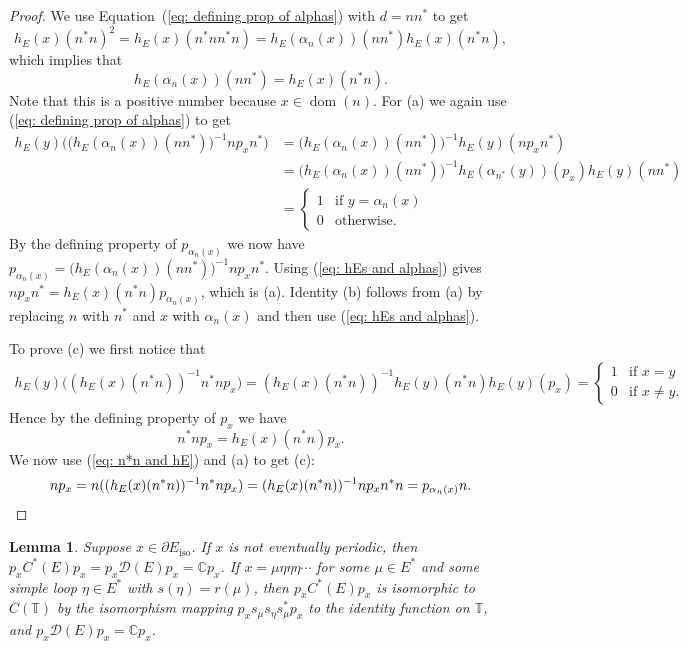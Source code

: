 \documentclass[12pt, a4paper]{amsart}
\numberwithin{equation}{section}
\newtheorem{lemma}[thm]{Lemma}
\theoremstyle{definition}
\theoremstyle{remark}
\begin{document}
\begin{proof}
We use Equation~(\ref{eq: defining prop of alphas}) with 
$d=nn^*$ 
to get
\[
h_E(x)(n^*n)^2=h_E(x)(n^*nn^*n)=h_E(\alpha_n(x))(nn^*)h_E(x)(n^*n),
\]
which implies that 
\begin{equation}\label{eq: hEs and alphas}
h_E(\alpha_n(x))(nn^*)=h_E(x)(n^*n). 
\end{equation}
Note that this is a 
positive number because $x\in{{\operatorname{dom}}}(n)$. For (a) we again use 
(\ref{eq: defining prop of alphas}) to get
\begin{align*}
h_E(y)\big(\bigl(h_E(\alpha_n(x))(nn^*)\bigr)^{-1}np_xn^*\big) &= 
\bigl(h_E(\alpha_n(x))(nn^*)\bigr)^{-1}h_E(y)(np_xn^*)\\
&= \bigl(h_E(\alpha_n(x))(nn^*)\bigr)^{-1}h_E(\alpha_{n^*}(y))(p_x)h_E(y)(nn^*)\\
&= 
\begin{cases}
1 & \text{if $y=\alpha_n(x)$}\\
0 & \text{otherwise}.
\end{cases}
\end{align*}
By the defining property of $p_{\alpha_n(x)}$ we now have 
$p_{\alpha_n(x)}=\bigl(h_E(\alpha_n(x))(nn^*)\bigr)^{-1}np_xn^*$. Using (\ref{eq: hEs and 
alphas}) gives $np_xn^*=h_E(x)(n^*n)p_{\alpha_n(x)}$, which is (a). 
Identity (b) follows from (a) by replacing $n$ with $n^*$ and $x$ with 
$\alpha_n(x)$ and then use (\ref{eq: hEs and 
alphas}).

To prove (c) we first notice that
\begin{align*}
h_E(y)\big((h_E(x)(n^*n))^{-1}n^*np_x\big)=(h_E(x)(n^*n))^{-1}h_E(y)(n^*n)h_E(y)(p_x)=
\begin{cases}
1 & \text{if $x=y$}\\
0 & \text{if $x\not=y$.}
\end{cases}
\end{align*} 
Hence by the defining property of $p_x$ we have
\begin{equation}\label{eq: n*n and hE}
n^*np_x=h_E(x)(n^*n)p_x.
\end{equation} 
We now use (\ref{eq: n*n and hE}) and (a) to get (c): 
\[
np_x = n((h_E(x)(n^*n))^{-1}n^*np_x)=(h_E(x)(n^*n))^{-1}np_x 
n^*n=p_{\alpha_n(x)}n.\qedhere
\] 
\end{proof}

\begin{lemma}\label{lem:corner}
	Suppose $x\in\partial E_{{\operatorname{iso}}}$. If $x$ is not eventually periodic, then 
	$p_xC^*(E)p_x=p_x\mathcal{D}(E)p_x={\mathbb{C}} p_x$. If $x=\mu\eta\eta\eta\cdots$ 
	for some $\mu\in E^*$ and some simple loop $\eta\in E^*$ with 
	$s(\eta)=r(\mu)$, then $p_xC^*(E)p_x$ is isomorphic to $C({\mathbb{T}})$ by the 
	isomorphism mapping $p_xs_\mu s_\eta s_\mu^*p_x$ to the identity function 
	on ${\mathbb{T}}$, and $p_x\mathcal{D}(E)p_x={\mathbb{C}} p_x$. 
\end{lemma}
\end{document}
